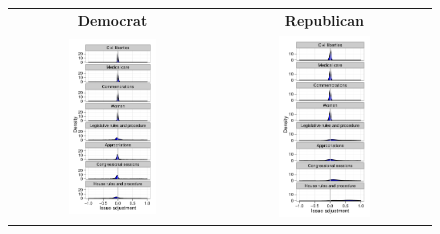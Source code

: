 \begin{figure}
  \center
  \begin{tabular}{cc}
    \Large \textbf{Democrat} & \Large \textbf{Republican} \normalsize \\
  \includegraphics[width=0.45\textwidth]{chapter_spatial_voting_with_text/figures/3393_issue_adjustment_density_democrats.pdf} &
  \includegraphics[width=0.45\textwidth]{chapter_spatial_voting_with_text/figures/3393_issue_adjustment_density_republicans.pdf} \\

\end{tabular}
\end{figure}
